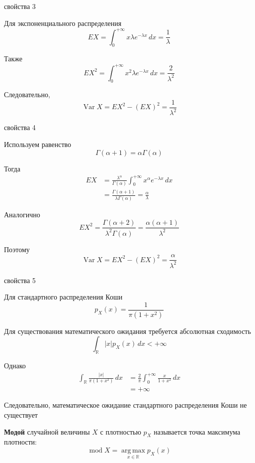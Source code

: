 \documentclass[12pt,a4paper]{article}
\begin{document}
\begin{proofbox}{свойства 3}

Для экспоненциального распределения
\[
EX
=
\int_0^{+\infty}
x\lambda e^{-\lambda x}\,dx
=
\frac1\lambda
\]

Также
\[
EX^2
=
\int_0^{+\infty}
x^2\lambda e^{-\lambda x}\,dx
=
\frac{2}{\lambda^2}
\]

Следовательно,
\[
\operatorname{Var}X
=
EX^2-(EX)^2
=
\frac1{\lambda^2}
\]

\end{proofbox}

\begin{proofbox}{свойства 4}

Используем равенство
\[
\Gamma(\alpha+1)=\alpha\Gamma(\alpha)
\]

Тогда
\[
\begin{aligned}
EX
&=
\frac{\lambda^\alpha}{\Gamma(\alpha)}
\int_0^{+\infty}
x^\alpha e^{-\lambda x}\,dx\\
&=
\frac{\Gamma(\alpha+1)}
{\lambda\Gamma(\alpha)}
=
\frac{\alpha}{\lambda}
\end{aligned}
\]

Аналогично
\[
EX^2
=
\frac{\Gamma(\alpha+2)}
{\lambda^2\Gamma(\alpha)}
=
\frac{\alpha(\alpha+1)}{\lambda^2}
\]

Поэтому
\[
\operatorname{Var}X
=
EX^2-(EX)^2
=
\frac{\alpha}{\lambda^2}
\]

\end{proofbox}

\begin{proofbox}{свойства 5}

Для стандартного распределения Коши
\[
p_X(x)
=
\frac{1}{\pi(1+x^2)}
\]

Для существования математического ожидания требуется абсолютная сходимость
\[
\int_{\mathbb{R}}
|x|p_X(x)\,dx
<
+\infty
\]

Однако
\[
\begin{aligned}
\int_{\mathbb{R}}
\frac{|x|}{\pi(1+x^2)}\,dx
&=
\frac{2}{\pi}
\int_0^{+\infty}
\frac{x}{1+x^2}\,dx\\
&=
+\infty
\end{aligned}
\]

Следовательно, математическое ожидание стандартного распределения Коши не существует

\end{proofbox}

\begin{definition}

\textbf{Модой} случайной величины $X$ с плотностью $p_X$ называется точка максимума плотности:
\[
\operatorname{mod}X
=
\operatorname*{arg\,max}_{x\in\mathbb{R}}p_X(x)
\]

\end{definition}
\end{document}
